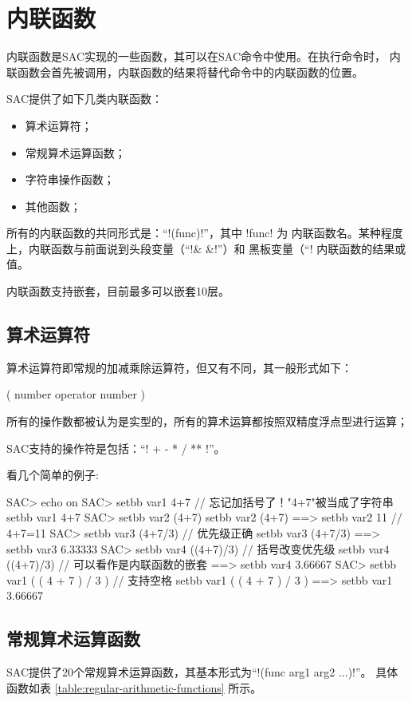 \section{内联函数}

内联函数是SAC实现的一些函数，其可以在SAC命令中使用。在执行命令时，
内联函数会首先被调用，内联函数的结果将替代命令中的内联函数的位置。

SAC提供了如下几类内联函数：
\begin{itemize}
\item 算术运算符；
\item 常规算术运算函数；
\item 字符串操作函数；
\item 其他函数；
\end{itemize}

所有的内联函数的共同形式是：``!(func)!''，其中 !func! 为
内联函数名。某种程度上，内联函数与前面说到头段变量（``!& &!''）和
黑板变量（``!%
内联函数的结果或值。

内联函数支持嵌套，目前最多可以嵌套10层。

\subsection{算术运算符}
算术运算符即常规的加减乘除运算符，但又有不同，其一般形式如下：
\begin{SACCode}
    ( number operator number )
\end{SACCode}
所有的操作数都被认为是实型的，所有的算术运算都按照双精度浮点型进行运算；

SAC支持的操作符是包括：``! +  -  *  /  ** !''。

看几个简单的例子:
\begin{SACCode}
SAC> echo on
SAC> setbb var1 4+7             // 忘记加括号了！"4+7"被当成了字符串
 setbb var1 4+7
SAC> setbb var2 (4+7)
 setbb var2 (4+7)
 ==>  setbb var2 11             // 4+7=11
SAC> setbb var3 (4+7/3)         // 优先级正确
 setbb var3 (4+7/3)
 ==>  setbb var3 6.33333
SAC> setbb var4 ((4+7)/3)       // 括号改变优先级
 setbb var4 ((4+7)/3)           // 可以看作是内联函数的嵌套
 ==>  setbb var4 3.66667
SAC> setbb var1 ( ( 4 + 7 ) / 3 )   // 支持空格
 setbb var1 ( ( 4 + 7 ) / 3 )
 ==>  setbb var1 3.66667
\end{SACCode}

\subsection{常规算术运算函数}
SAC提供了20个常规算术运算函数，其基本形式为``!(func arg1 arg2 ...)!''。
具体函数如表 \ref{table:regular-arithmetic-functions} 所示。


